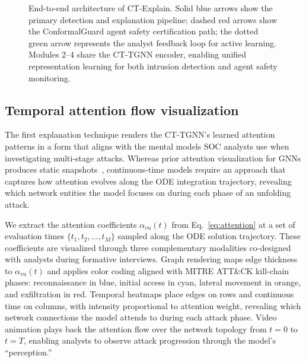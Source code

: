 \documentclass[preprint,review,12pt]{elsarticle}
\begin{document}
\begin{figure}[!t]
{
}%
\caption{End-to-end architecture of CT-Explain. Solid blue arrows show the primary detection and explanation pipeline; dashed red arrows show the ConformalGuard agent safety certification path; the dotted green arrow represents the analyst feedback loop for active learning. Modules 2--4 share the CT-TGNN encoder, enabling unified representation learning for both intrusion detection and agent safety monitoring.}
\label{fig:architecture}
\end{figure}

\subsection{Temporal attention flow visualization}
\label{subsec:attention_flow}

The first explanation technique renders the CT-TGNN's learned attention patterns in a form that aligns with the mental models SOC analysts use when investigating multi-stage attacks. Whereas prior attention visualization for GNNs produces static snapshots~\cite{ying_gnnexplainer_2019}, continuous-time models require an approach that captures how attention evolves along the ODE integration trajectory, revealing which network entities the model focuses on during each phase of an unfolding attack.

We extract the attention coefficients $\alpha_{vu}(t)$ from Eq.~\eqref{eq:attention} at a set of evaluation times $\{t_1, t_2, \ldots, t_M\}$ sampled along the ODE solution trajectory. These coefficients are visualized through three complementary modalities co-designed with analysts during formative interviews. Graph rendering maps edge thickness to $\alpha_{vu}(t)$ and applies color coding aligned with MITRE ATT\&CK kill-chain phases: reconnaissance in blue, initial access in cyan, lateral movement in orange, and exfiltration in red. Temporal heatmaps place edges on rows and continuous time on columns, with intensity proportional to attention weight, revealing which network connections the model attends to during each attack phase. Video animation plays back the attention flow over the network topology from $t = 0$ to $t = T$, enabling analysts to observe attack progression through the model's ``perception.''
\end{document}
